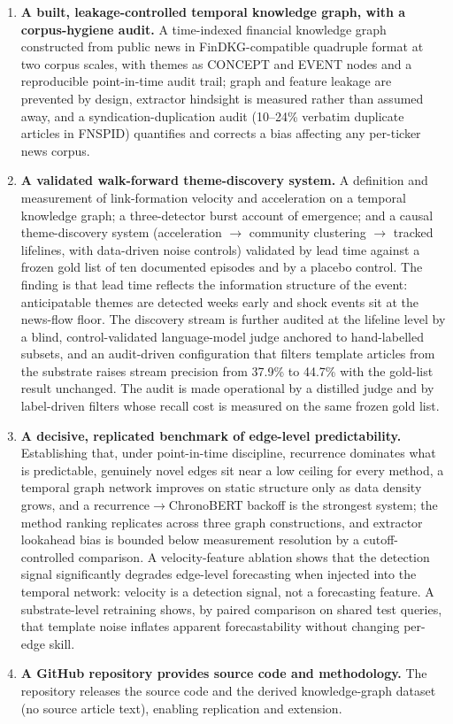 \documentclass[a4paper,12pt]{report}
\begin{document}
\begin{enumerate}
\item \textbf{A built, leakage-controlled temporal knowledge graph, with a
corpus-hygiene audit.} A time-indexed financial knowledge graph constructed
from public news in FinDKG-compatible quadruple format at two corpus scales,
with themes as CONCEPT and EVENT nodes and a reproducible point-in-time audit
trail; graph and feature leakage are prevented by design, extractor hindsight
is measured rather than assumed away, and a syndication-duplication audit
(10--24\% verbatim duplicate articles in FNSPID) quantifies and corrects a
bias affecting any per-ticker news corpus.

\item \textbf{A validated walk-forward theme-discovery system.} A definition
and measurement of link-formation velocity and acceleration on a temporal
knowledge graph; a three-detector burst account of emergence; and a causal
theme-discovery system (acceleration $\rightarrow$ community clustering
$\rightarrow$ tracked lifelines, with data-driven noise controls) validated by
lead time against a frozen gold list of ten documented episodes and by a
placebo control. The finding is that lead time reflects the information
structure of the event: anticipatable themes are detected weeks early and
shock events sit at the news-flow floor. The discovery stream is further
audited at the lifeline level by a blind, control-validated language-model
judge anchored to hand-labelled subsets, and an audit-driven configuration
that filters template articles from the substrate raises stream precision
from 37.9\% to 44.7\% with the gold-list result unchanged. The audit is
made operational by a distilled judge and by label-driven filters whose
recall cost is measured on the same frozen gold list.

\item \textbf{A decisive, replicated benchmark of edge-level predictability.}
Establishing that, under point-in-time discipline, recurrence dominates what is
predictable, genuinely novel edges sit near a low ceiling for every method, a
temporal graph network improves on static structure only as data density grows,
and a recurrence$\rightarrow$ChronoBERT backoff is the strongest system;
the method ranking replicates across three graph constructions, and
extractor lookahead bias is bounded below measurement resolution by a
cutoff-controlled comparison. A velocity-feature ablation shows that the
detection signal significantly degrades edge-level forecasting when injected
into the temporal network: velocity is a detection signal, not a forecasting
feature. A substrate-level retraining shows, by paired comparison on
shared test queries, that template noise inflates apparent
forecastability without changing per-edge skill.

\item \textbf{A GitHub repository provides source code and methodology.}
The repository releases the source code and the derived knowledge-graph
dataset (no source article text), enabling replication and extension.
\end{enumerate}
\end{document}
